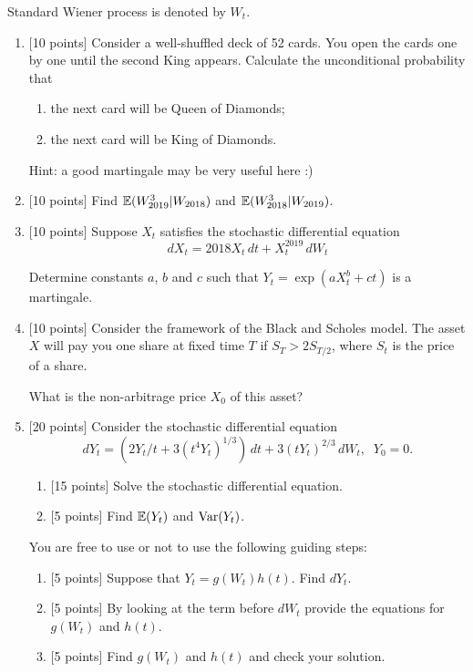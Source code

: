 \documentclass[12pt, a4paper]{article}
\begin{document}
Standard Wiener process is denoted by $W_t$.

\begin{enumerate}[resume]
  \item {[10 points]} Consider a well-shuffled deck of 52 cards. You open the cards one by one until the second King appears. Calculate the unconditional probability that
  \begin{enumerate}
    \item the next card will be Queen of Diamonds;
    \item the next card will be King of Diamonds.
  \end{enumerate}

  Hint: a good martingale may be very useful here :)

  \item {[10 points]} Find $\mathbb{E}(W_{2019}^3 | W_{2018})$ and $\mathbb{E}(W_{2018}^3 | W_{2019})$.


  \item {[10 points]} Suppose $X_t$ satisfies the stochastic differential equation
  \[
    dX_t = 2018 X_t \, dt + X_t^{2019} \, dW_t
  \]

  Determine constants $a$, $b$ and $c$ such that $Y_t = \exp(aX_t^b + ct)$ is a martingale.

  \item {[10 points]} Consider the framework of the Black and Scholes model.
The asset $X$ will pay you one share at fixed time $T$ if $S_T > 2S_{T/2}$,
where $S_t$ is the price of a share.

What is the non-arbitrage price $X_0$ of this asset?
  \item {[20 points]} Consider the stochastic differential equation
  \[
  dY_t =(2Y_t/t + 3(t^4Y_t)^{1/3}) \, dt + 3(tY_t)^{2/3} \, dW_t, \;\; Y_0=0.
  \]

  \begin{enumerate}
    \item {[15 points]} Solve the stochastic differential equation.
    \item {[5 points]} Find $\mathbb{E}(Y_t)$ and $\operatorname{Var}(Y_t)$.
  \end{enumerate}

  You are free to use or not to use the following guiding steps:

  \begin{enumerate}[resume]
    \item {[5 points]} Suppose that $Y_t=g(W_t)h(t)$. Find $dY_t$.
    \item {[5 points]} By looking at the term before $dW_t$ provide the equations for $g(W_t)$ and $h(t)$.
    \item {[5 points]} Find $g(W_t)$ and $h(t)$ and check your solution.
  \end{enumerate}

\end{enumerate}
\end{document}

